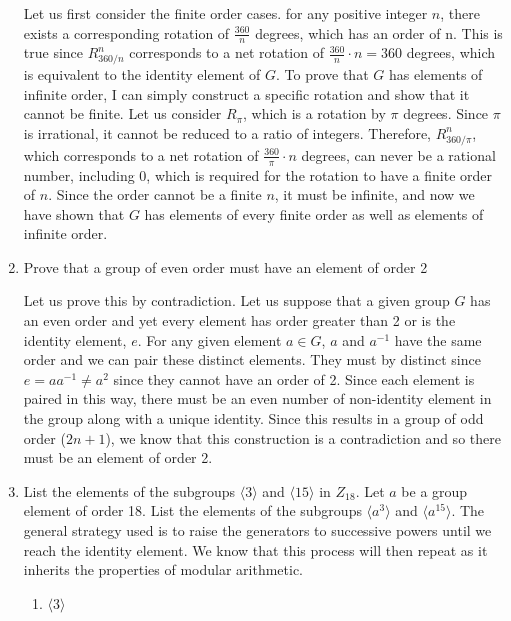 \documentclass{article}
\begin{document}
\begin{enumerate}
\begin{flushleft}
    Let us first consider the finite order cases. for any positive integer $n$, there exists a corresponding rotation of $\frac{360}{n}$ degrees, which has an order of n. This is true since $R_{360/n}^n$ corresponds to a net rotation of $\frac{360}{n}\cdot n = 360$ degrees, which is equivalent to the identity element of $G$. To prove that $G$ has elements of infinite order, I can simply construct a specific rotation and show that it cannot be finite. Let us consider $R_{\pi}$, which is a rotation by $\pi$ degrees. Since $\pi$ is irrational, it cannot be reduced to a ratio of integers. Therefore, $R_{360/\pi}^n$, which corresponds to a net rotation of $\frac{360}{\pi}\cdot n$ degrees, can never be a rational number, including 0, which is required for the rotation to have a finite order of $n$. Since the order cannot be a finite $n$, it must be infinite, and now we have shown that $G$ has elements of every finite order as well as elements of infinite order.
    \end{flushleft}
    \item Prove that a group of even order must have an element of order 2
    \begin{flushleft}
    Let us prove this by contradiction. Let us suppose that a given group $G$ has an even order and yet every element has order greater than 2 or is the identity element, $e$. For any given element $a \in G$, $a$ and $a^{-1}$ have the same order and we can pair these distinct elements. They must by distinct since $e = aa^{-1} \not= a^2$ since they cannot have an order of 2. Since each element is paired in this way, there must be an even number of non-identity element in the group along with a unique identity. Since this results in a group of odd order ($2n + 1$), we know that this construction is a contradiction and so there must be an element of order 2.
    \end{flushleft}
    \item List the elements of the subgroups $\langle3\rangle$ and $\langle15\rangle$ in $Z_{18}$. Let $a$ be a group element of order 18. List the elements of the subgroups $\langle a^3\rangle$ and $\langle a^{15}\rangle$. \newline\newline
    The general strategy used is to raise the generators to successive powers until we reach the identity element. We know that this process will then repeat as it inherits the properties of modular arithmetic.
    \begin{enumerate}
        \item $\langle3\rangle$

\end{enumerate}
\end{enumerate}
\end{document}
